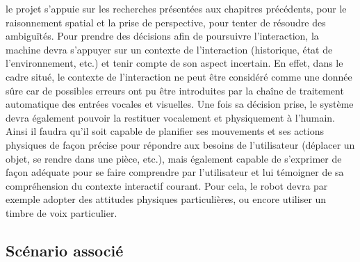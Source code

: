 \documentclass[a4paper,11pt,twoside]{StyleThese}
\begin{document}
le projet s'appuie sur les recherches présentées aux chapitres précédents, pour le  raisonnement
spatial et la prise de perspective, pour tenter de résoudre des ambiguïtés.
Pour prendre des décisions afin de poursuivre l’interaction, la machine devra s’appuyer sur un contexte de l’interaction (historique, état de l’environnement, etc.) et tenir
compte de son aspect incertain. En effet, dans le cadre situé, le contexte de l’interaction ne peut être considéré comme une donnée sûre car de possibles erreurs ont pu être
introduites par la chaîne de traitement automatique des entrées vocales et visuelles.
Une fois sa décision prise, le système devra également pouvoir la restituer vocalement et physiquement à l’humain. Ainsi il faudra qu’il soit capable de planifier ses
mouvements et ses actions physiques de façon précise pour répondre aux besoins de
l’utilisateur (déplacer un objet, se rendre dans une pièce, etc.), mais également capable
de s’exprimer de façon adéquate pour se faire comprendre par l’utilisateur et lui témoigner de sa compréhension du contexte interactif courant. Pour cela, le robot devra par
exemple adopter des attitudes physiques particulières, ou encore utiliser un timbre de
voix particulier.


\subsection{Scénario associé}
\end{document}
